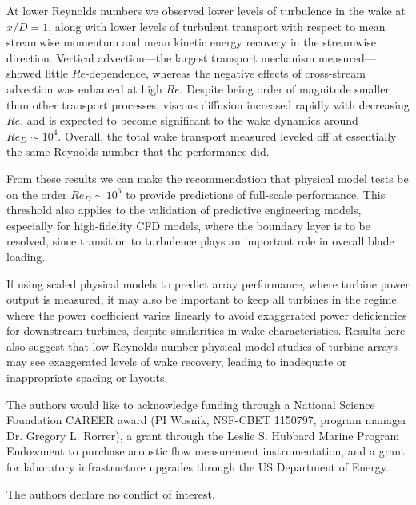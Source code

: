 \documentclass[energies,article,accept,moreauthors,pdftex,12pt,a4paper]{mdpi}
\begin{document}
At lower Reynolds numbers we observed lower levels of turbulence in the wake at
$x/D=1$, along with lower levels of turbulent transport with respect to mean
streamwise momentum and mean kinetic energy recovery in the streamwise
direction. Vertical advection---the largest transport mechanism
measured---showed little $Re$-dependence, whereas the negative effects of
cross-stream advection was enhanced at high $Re$. Despite being order of
magnitude smaller than other transport processes, viscous diffusion increased
rapidly with decreasing $Re$, and is expected to become significant to the wake 
dynamics around $Re_D \sim 10^4$.
Overall, the total wake transport measured leveled
off at essentially the same Reynolds number that the performance did.

From these results we can make the recommendation that physical model tests be
on the order $Re_D \sim 10^6$ to provide predictions of full-scale performance.
This threshold also applies to the validation of predictive engineering models,
especially for high-fidelity CFD models, where the boundary layer is to be
resolved, since transition to turbulence plays an important role in overall
blade loading.

If using scaled physical models to predict array performance, where turbine
power output is measured, it may also be important to keep all turbines in the
regime where the power coefficient varies linearly to avoid exaggerated power
deficiencies for downstream turbines, despite similarities in wake
characteristics. Results here also suggest that low Reynolds number physical
model studies of turbine arrays may see exaggerated levels of wake recovery,
leading to inadequate or inappropriate spacing or layouts.



The authors would like to acknowledge funding through a National Science
Foundation CAREER award (PI Wosnik, NSF-CBET 1150797, program manager Dr. 
Gregory L. Rorrer), a grant through the Leslie S. Hubbard Marine Program 
Endowment to
purchase acoustic flow measurement instrumentation, and a grant for laboratory
infrastructure upgrades through the US Department of Energy.


The authors declare no conflict of interest.




\end{document}
